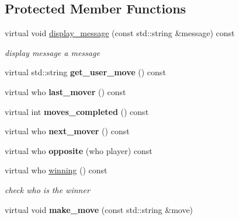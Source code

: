 \subsection*{Protected Member Functions}
\begin{DoxyCompactItemize}
\item 
virtual void \hyperlink{classmain__savitch__14_1_1game_ab8b87c3a1b68634861a8c0ed2b9f1992}{display\+\_\+message} (const std\+::string \&message) const 
\begin{DoxyCompactList}\small\item\em display message a message \end{DoxyCompactList}\item 
virtual std\+::string {\bfseries get\+\_\+user\+\_\+move} () const \hypertarget{classmain__savitch__14_1_1game_a1265f262f5a15bca5b532e6e97d13089}{}\label{classmain__savitch__14_1_1game_a1265f262f5a15bca5b532e6e97d13089}

\item 
virtual who {\bfseries last\+\_\+mover} () const \hypertarget{classmain__savitch__14_1_1game_a38d435da6aadc192ac10160b26ea0cc1}{}\label{classmain__savitch__14_1_1game_a38d435da6aadc192ac10160b26ea0cc1}

\item 
virtual int {\bfseries moves\+\_\+completed} () const \hypertarget{classmain__savitch__14_1_1game_aee677d1ef52c35474cb7c6071bb71749}{}\label{classmain__savitch__14_1_1game_aee677d1ef52c35474cb7c6071bb71749}

\item 
virtual who {\bfseries next\+\_\+mover} () const \hypertarget{classmain__savitch__14_1_1game_a0d445fdec3201c91c145ee2763e08922}{}\label{classmain__savitch__14_1_1game_a0d445fdec3201c91c145ee2763e08922}

\item 
virtual who {\bfseries opposite} (who player) const \hypertarget{classmain__savitch__14_1_1game_ae38d001e92ebe46e1a1433e41446c7ab}{}\label{classmain__savitch__14_1_1game_ae38d001e92ebe46e1a1433e41446c7ab}

\item 
virtual who \hyperlink{classmain__savitch__14_1_1game_a081611c42aa66b4d91bbefeec47c7c4e}{winning} () const 
\begin{DoxyCompactList}\small\item\em check who is the winner \end{DoxyCompactList}\item 
virtual void {\bfseries make\+\_\+move} (const std\+::string \&move)\hypertarget{classmain__savitch__14_1_1game_a20597d0caa907aea47b27fed8be3759b}{}\label{classmain__savitch__14_1_1game_a20597d0caa907aea47b27fed8be3759b}


\end{DoxyCompactItemize}

